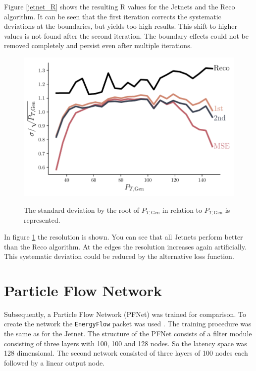 \documentclass[12pt, a4paper]{thesis}
\begin{document}
Figure \ref{jetnet_R} shows the resulting R values for the Jetnets and
the Reco algorithm. It can be seen that the first iteration corrects
the systematic deviations at the boundaries, but yields too high
results. This shift to higher values is not found after the second
iteration. The boundary effects could not be removed completely and
persist even after multiple iterations.

\begin{figure}[htbp]
\centering
\includegraphics[width=.9\linewidth]{../images/jetnet_res.pdf}
\label{jetnet_res}
\caption{ The standard deviation by the root of \(P_{T, \text{Gen}}\)
  in relation to \(P_{T, \text{Gen}}\) is represented.}
\end{figure}

In figure \ref{jetnet_res} the resolution is shown. You can see that all
Jetnets perform better than the Reco algorithm. At the edges the
resolution increases again artificially. This systematic deviation
could be reduced by the alternative loss function.

\section{Particle Flow Network}
\label{sec:org307355e}

Subsequently, a Particle Flow Network (PFNet) was trained for
comparison. To create the network the \texttt{EnergyFlow} packet was used
\cite{komiske19_energ_flow_networ}. The training procedure was the same
as for the Jetnet. The structure of the PFNet consists of a filter
module consisting of three layers with 100, 100 and 128 nodes. So the
latency space was 128 dimensional. The second network consisted of
three layers of 100 nodes each followed by a linear output node.
\end{document}
